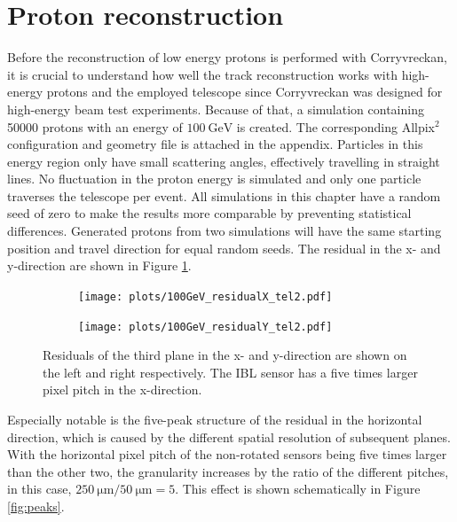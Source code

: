 \section{Proton reconstruction}\label{sec:proton_reconstruction}
Before the reconstruction of low energy protons is performed with Corryvreckan, it is crucial to understand how well the
track reconstruction works with high-energy protons and the employed telescope since Corryvreckan was designed for high-energy beam test experiments.
Because of that, a simulation containing 50000 protons
with an energy of $\SI{100}{\giga\eV}$ is created. The corresponding Allpix$^2$ configuration and geometry file is attached in the appendix.
Particles in this energy region only have small scattering angles, effectively travelling
in straight lines.
No fluctuation in the proton energy is simulated and only one particle traverses
the telescope per event. All simulations in this chapter have a random seed of zero to make the results more comparable by preventing
statistical differences. Generated protons from two simulations will have the same starting position and travel direction for equal random seeds.
The residual in the x- and y-direction are shown in Figure \ref{fig:100GeV}.

\begin{figure}
  \hspace{-0.6cm}
  \begin{subfigure}{0.51\textwidth}
      \centering
      \texttt{[image: plots/100GeV\_residualX\_tel2.pdf]}
  \end{subfigure}
  \begin{subfigure}{0.51\textwidth}
      \texttt{[image: plots/100GeV\_residualY\_tel2.pdf]}
  \end{subfigure}
  \caption{Residuals of the third plane in the x- and y-direction are shown on the left and right respectively.
  The IBL sensor has a five times larger pixel pitch in the x-direction. }
  \label{fig:100GeV}
\end{figure}

Especially notable is the five-peak structure of the residual in the horizontal direction, which is caused by the different
spatial resolution of subsequent planes. With the horizontal pixel pitch of the non-rotated sensors being
five times larger than the other two, the granularity increases by the ratio of the different pitches, in this case,
$\SI{250}{\micro\meter}/\SI{50}{\micro\meter} = 5$. This effect is shown schematically in Figure \ref{fig:peaks}.

